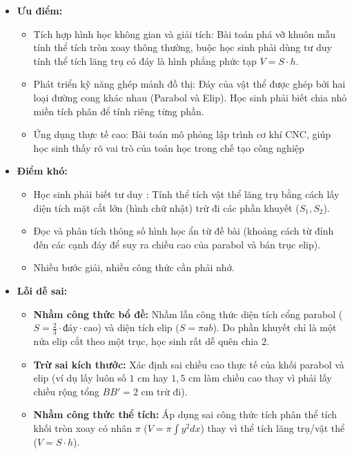 \documentclass[12pt,a4paper,oneside]{book}
\theoremstyle{theorem}
\theoremstyle{definition}
\begin{document}
\begin{itemize}
    \item \textbf{Ưu điểm:}
    \begin{itemize}
        \item Tích hợp hình học không gian và giải tích: Bài toán phá vỡ khuôn mẫu tính thể tích tròn xoay thông thường, buộc học sinh phải dùng tư duy tính thể tích lăng trụ có đáy là hình phẳng phức tạp $V = S \cdot h$.
        \item Phát triển kỹ năng ghép mảnh đồ thị: Đáy của vật thể được ghép bởi hai loại đường cong khác nhau (Parabol và Elip). Học sinh phải biết chia nhỏ miền tích phân để tính riêng từng phần.
        \item Ứng dụng thực tế cao: Bài toán mô phỏng lập trình cơ khí CNC, giúp học sinh thấy rõ vai trò của toán học trong chế tạo công nghiệp
    \end{itemize}
    \item \textbf{Điểm khó:} 
    \begin{itemize}
        \item Học sinh phải biết tư duy : Tính thể tích vật thể lăng trụ bằng cách lấy diện tích mặt cắt lớn (hình chữ nhật) trừ đi các phần khuyết ($S_1, S_2$).
        \item Đọc và phân tích thông số hình học ẩn từ đề bài (khoảng cách từ đỉnh đến các cạnh đáy để suy ra chiều cao của parabol và bán trục elip). 
        \item Nhiều bước giải, nhiều công thức cần phải nhớ.
    \end{itemize}
    \item \textbf{Lỗi dễ sai:} 
    \begin{itemize}
        \item \textbf{Nhầm công thức bổ đề:} Nhầm lẫn công thức diện tích cổng parabol ($S = \frac{2}{3} \cdot \text{đáy} \cdot \text{cao}$) và diện tích elip ($S = \pi a b$). Do phần khuyết chỉ là một nửa elip cắt theo một trục, học sinh rất dễ quên chia $2$.
        \item \textbf{Trừ sai kích thước:} Xác định sai chiều cao thực tế của khối parabol và elip (ví dụ lấy luôn số $1\text{ cm}$ hay $1{,}5\text{ cm}$ làm chiều cao thay vì phải lấy chiều rộng tổng $BB' = 2\text{ cm}$ trừ đi).
        \item \textbf{Nhầm công thức thể tích:} Áp dụng sai công thức tích phân thể tích khối tròn xoay có nhân $\pi$ ($V = \pi \int y^2 dx$) thay vì thể tích lăng trụ/vật thể ($V = S \cdot h$).
    \end{itemize}
\end{itemize}
\end{document}
